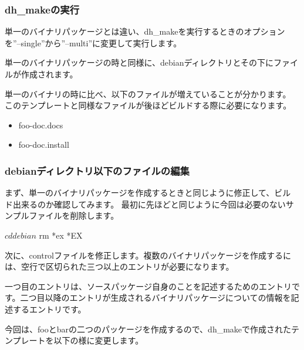 \documentclass[mingoth,a4paper]{jsarticle}
\begin{document}
\subsubsection{dh\_makeの実行}
単一のバイナリパッケージとは違い、dh\_makeを実行するときのオプション
を''--single''から''--multi''に変更して実行します。


単一のバイナリパッケージの時と同様に、debianディレクトリとその下にファイ
ルが作成されます。

単一のバイナリの時に比べ、以下のファイルが増えていることが分かります。
このテンプレートと同様なファイルが後ほどビルドする際に必要になります。
\begin{itemize}
 \item
      foo-doc.docs
 \item
      foo-doc.install
\end{itemize}

\subsubsection{debianディレクトリ以下のファイルの編集}
まず、単一のバイナリパッケージを作成するときと同じように修正して、ビル
ド出来るのか確認してみます。
最初に先ほどと同じように今回は必要のないサンプルファイルを削除します。

\begin{commandline}
$ cd debian
$ rm *ex *EX
\end{commandline}

次に、controlファイルを修正します。複数のバイナリパッケージを作成するに
は、空行で区切られた三つ以上のエントリが必要になります。

一つ目のエントリは、ソースパッケージ自身のことを記述するためのエントリで
す。二つ目以降のエントリが生成されるバイナリパッケージについての情報を記
述するエントリです。

今回は、fooとbarの二つのパッケージを作成するので、dh\_makeで作成されたテ
ンプレートを以下の様に変更します。
\end{document}
